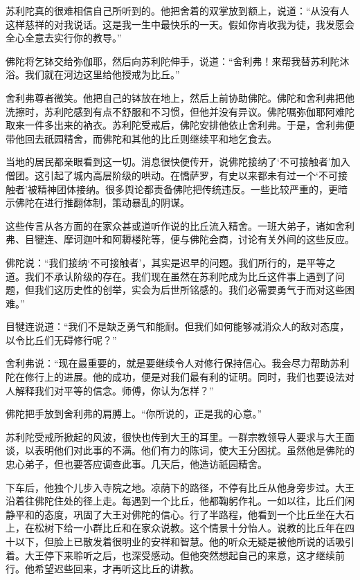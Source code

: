 \documentclass[12pt,twoside,openany]{book}
\begin{document}
苏利陀真的很难相信自己所听到的。他把舍着的双掌放到额上，说道：“从没有人这样慈祥的对我说话。这是我一生中最快乐的一天。假如你肯收我为徒，我发愿会全心全意去实行你的教导。”

佛陀将乞钵交给弥伽耶，然后向苏利陀伸手，说道：“舍利弗！来帮我替苏利陀沐浴。我们就在河边这里给他授戒为比丘。”

舍利弗尊者微笑。他把自己的钵放在地上，然后上前协助佛陀。佛陀和舍利弗把他洗擦时，苏利陀感到有点不舒服和不习惯，但他并没有异议。佛陀嘱弥伽耶阿难陀取来一件多出来的衲衣。苏利陀受戒后，佛陀安排他依止舍利弗。于是，舍利弗便带他回去祇园精舍，而佛陀和其他的比丘则继续平和地乞食去。

当地的居民都亲眼看到这一切。消息很快便传开，说佛陀接纳了‘不可接触者’加入僧团。这引起了城内高层阶级的哄动。在憍萨罗，有史以来都未有过一个‘不可接触者’被精神团体接纳。很多舆论都责备佛陀把传统违反。一些比较严重的，更暗示佛陀在进行推翻体制，策动暴乱的阴谋。

这些传言从各方面的在家众甚或道听作说的比丘流入精舍。一班大弟子，诸如舍利弗、目犍连、摩诃迦叶和阿耨楼陀等，便与佛陀会商，讨论有关外间的这些反应。

佛陀说：“我们接纳‘不可接触者’，其实是迟早的问题。我们所行的，是平等之道。我们不承认阶级的存在。我们现在虽然在苏利陀成为比丘这件事上遇到了问题，但我们这历史性的创举，实会为后世所铭感的。我们必需要勇气于而对这些困难。”

目犍连说道：“我们不是缺乏勇气和能耐。但我们如何能够减消众人的敌对态度，以令比丘们无碍修行呢？”

舍利弗说：“现在最重要的，就是要继续令人对修行保持信心。我会尽力帮助苏利陀在修行上的进展。他的成功，便是对我们最有利的证明。同时，我们也要设法对人解释我们对平等的信念。师傅，你认为怎样？”

佛陀把手放到舍利弗的肩膊上。“你所说的，正是我的心意。”

苏利陀受戒所掀起的风波，很快也传到大王的耳里。一群宗教领导人要求与大王面谈，以表明他们对此事的不满。他们有力的陈词，使大王分困扰。虽然他是佛陀的忠心弟子，但也要答应调查此事。几天后，他造访祇园精舍。

下车后，他独个儿步入寺院之地。凉荫下的路径，不停有比丘从他身旁步过。大王沿着往佛陀住处的径上走。每遇到一个比丘，他都鞠躬作礼。一如以往，比丘们闲静平和的态度，巩固了大王对佛陀的信心。行了半路程，他看到一个比丘坐在大石上，在松树下给一小群比丘和在家众说教。这个情景十分怡人。说教的比丘年在四十以下，但脸上已散发着很明业的安祥和智慧。他的听众无疑是被他所说的话吸引着。大王停下来聆听之后，也深受感动。但他突然想起自己的来意，这才继续前行。他希望迟些回来，才再听这比丘的讲教。
\end{document}
